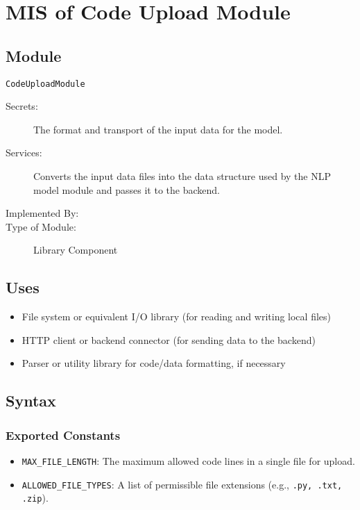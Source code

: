 \documentclass[12pt, titlepage]{article}
\begin{document}
\section{MIS of Code Upload Module} \label{mCodeUpload}

\subsection{Module}

\texttt{CodeUploadModule}

\begin{description}
    \item[Secrets:] The format and transport of the input data for the model.
    \item[Services:] Converts the input data files into the data structure
    used by the NLP model module and passes it to the backend.
    \item[Implemented By:] \progname{}
    \item[Type of Module:] Library Component
\end{description}

\subsection{Uses}

\begin{itemize}
    \item File system or equivalent I/O library (for reading and writing local files)
    \item HTTP client or backend connector (for sending data to the backend)
    \item Parser or utility library for code/data formatting, if necessary
\end{itemize}

\subsection{Syntax}

\subsubsection{Exported Constants}

\begin{itemize}
    \item \texttt{MAX\_FILE\_LENGTH}: The maximum allowed code lines in a single file for upload.
    \item \texttt{ALLOWED\_FILE\_TYPES}: A list of permissible file extensions (e.g., \texttt{.py, .txt, .zip}).
\end{itemize}
\end{document}
